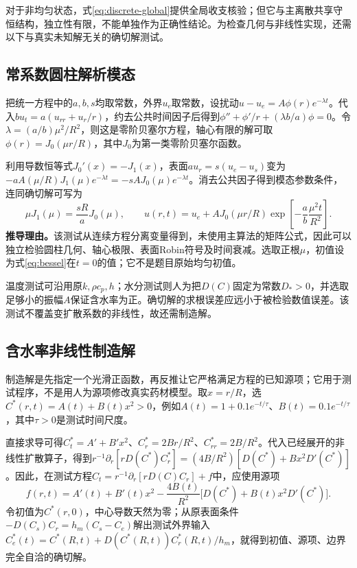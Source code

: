 \documentclass[UTF8,a4paper,zihao=-4,fontset=none]{ctexart}
\numberwithin{equation}{section}
\newcommand{\pd}{\partial}
\newcommand{\reason}[1]{\textbf{推导理由。}#1\par}
\begin{document}
对于非均匀状态，式\eqref{eq:discrete-global}提供全局收支核验；但它与主离散共享守恒结构，独立性有限，不能单独作为正确性结论。为检查几何与非线性实现，还需以下与真实未知解无关的确切解测试。

\subsection{常系数圆柱解析模态}
把统一方程中的$a,b,s$均取常数，外界$u_e$取常数，设扰动$u-u_e=A\phi(r)e^{-\lambda t}$。代入$b u_t=a(u_{rr}+u_r/r)$，约去公共时间因子后得到$\phi''+\phi'/r+(\lambda b/a)\phi=0$。令$\lambda=(a/b)\mu^2/R^2$，则这是零阶贝塞尔方程，轴心有限的解可取$\phi(r)=J_0(\mu r/R)$，其中$J_0$为第一类零阶贝塞尔函数。

利用导数恒等式$J_0'(x)=-J_1(x)$，表面$a u_r=s(u_e-u_s)$变为$-aA(\mu/R)J_1(\mu)e^{-\lambda t}=-sAJ_0(\mu)e^{-\lambda t}$。消去公共因子得到模态参数条件，连同确切解可写为
\begin{equation}
\mu J_1(\mu)=\frac{sR}{a}J_0(\mu),\qquad
u(r,t)=u_e+A J_0(\mu r/R)
\exp\!\left[-\frac{a}{b}\frac{\mu^2t}{R^2}\right].
\label{eq:bessel}
\end{equation}
\reason{该测试从连续方程分离变量得到，未使用主算法的矩阵公式，因此可以独立检验圆柱几何、轴心极限、表面Robin符号及时间衰减。选取正根$\mu$，初值设为式\eqref{eq:bessel}在$t=0$的值；它不是题目原始均匀初值。}

温度测试可沿用原$k,\rho c_p,h$；水分测试则人为把$D(C)$固定为常数$D_*>0$，并选取足够小的振幅$A$保证含水率为正。确切解的求根误差应远小于被检验数值误差。该测试不覆盖变扩散系数的非线性，故还需制造解。

\subsection{含水率非线性制造解}
制造解是先指定一个光滑正函数，再反推让它严格满足方程的已知源项；它用于测试程序，不是用人为源项修改真实药材模型。取$x=r/R$，选$C^*(r,t)=A(t)+B(t)x^2>0$，例如$A(t)=1+0.1e^{-t/\tau}$、$B(t)=0.1e^{-t/\tau}$，其中$\tau>0$是测试时间尺度。

直接求导可得$C_t^*=A'+B'x^2$、$C_r^*=2Br/R^2$、$C_{rr}^*=2B/R^2$。代入已经展开的非线性扩散算子，得到$r^{-1}\pd_r[rD(C^*)C_r^*]=(4B/R^2)[D(C^*)+Bx^2D'(C^*)]$。因此，在测试方程$C_t=r^{-1}\pd_r[rD(C)C_r]+f$中，应使用源项
\begin{equation}
f(r,t)=A'(t)+B'(t)x^2
-\frac{4B(t)}{R^2}\bigl[D(C^*)+B(t)x^2D'(C^*)\bigr].
\label{eq:manufactured}
\end{equation}
令初值为$C^*(r,0)$，中心导数天然为零；从原表面条件$-D(C_s)C_r=h_m(C_s-C_e)$解出测试外界输入$C_e^*(t)=C^*(R,t)+D(C^*(R,t))C_r^*(R,t)/h_m$，就得到初值、源项、边界完全自洽的确切解。
\end{document}

